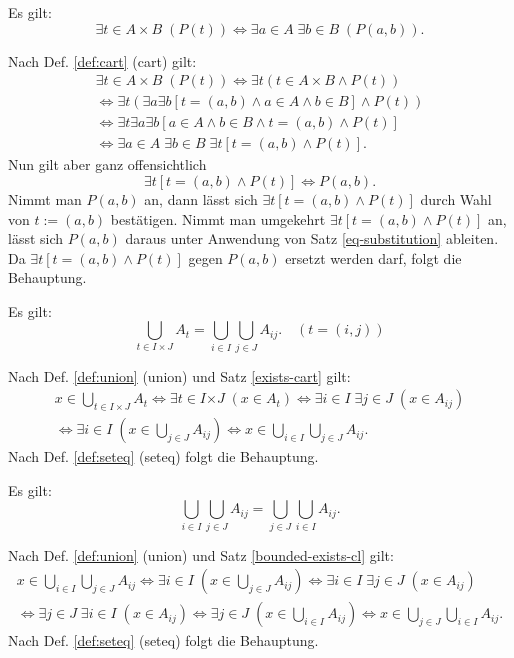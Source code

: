 \begin{Satz}\label{exists-cart}
Es gilt:
\[\exists t{\in}A{\times}B\;(P(t))
\iff \exists a{\in}A\;\exists b{\in}B\;(P(a,b)).\]
\end{Satz}

\begin{Beweis}
Nach Def. \ref{def:cart} (cart) gilt:
\begin{gather*}
\exists t{\in}A{\times}B\;(P(t))
\iff \exists t(t\in A\times B\land P(t))\\
\iff \exists t(\exists a\exists b[t=(a,b)\land a\in A\land b\in B]\land P(t))\\
\iff \exists t\exists a\exists b[a\in A\land b\in B\land t=(a,b)\land P(t)]\\
\iff \exists a{\in}A\;\exists b{\in}B\;\exists t[t=(a,b)\land P(t)].
\end{gather*}
Nun gilt aber ganz offensichtlich
\[\exists t[t=(a,b)\land P(t)]\iff P(a,b).\]
Nimmt man $P(a,b)$ an, dann lässt sich $\exists t[t=(a,b)\land P(t)]$
durch Wahl von $t:=(a,b)$ bestätigen. Nimmt man umgekehrt
$\exists t[t=(a,b)\land P(t)]$ an, lässt sich $P(a,b)$ daraus
unter Anwendung von Satz \ref{eq-substitution} ableiten.
Da $\exists t[t=(a,b)\land P(t)]$ gegen $P(a,b)$ ersetzt werden
darf, folgt die Behauptung.\,\qedsymbol
\end{Beweis}

\begin{Satz}\label{cup-cart}
Es gilt:
\[\bigcup_{t\in I\times J} A_t
= \bigcup_{i\in I}\bigcup_{j\in J} A_{ij}.\quad (t=(i,j))\]
\end{Satz}

\begin{Beweis}
Nach Def. \ref{def:union} (union) und Satz \ref{exists-cart} gilt:
\begin{gather*}
x\in \bigcup_{t\in I\times J} A_t
\iff \exists t{\in}I{\times J}\;(x\in A_t)
\iff \exists i{\in}I\;\exists j{\in}J\;(x\in A_{ij})\\
\iff \exists i{\in}I\; (x\in \bigcup_{j\in J} A_{ij})
\iff x\in\bigcup_{i\in I}\bigcup_{j\in J} A_{ij}.
\end{gather*}
Nach Def. \ref{def:seteq} (seteq) folgt die Behauptung.\,\qedsymbol
\end{Beweis}

\begin{Satz}
Es gilt:
\[\bigcup_{i\in I}\bigcup_{j\in J} A_{ij}
= \bigcup_{j\in J}\bigcup_{i\in I} A_{ij}.\]
\end{Satz}

\begin{Beweis}
Nach Def. \ref{def:union} (union) und Satz \ref{bounded-exists-cl} gilt:
\begin{gather*}
x\in\bigcup_{i\in I}\bigcup_{j\in J} A_{ij}
\iff \exists i{\in}I\;(x\in\bigcup_{j\in J} A_{ij})
\iff \exists i{\in}I\;\exists j{\in}J\;(x\in A_{ij})\\
\iff \exists j{\in}J\;\exists i{\in}I\;(x\in A_{ij})
\iff \exists j{\in}J\;(x\in \bigcup_{i\in I}A_{ij})
\iff x\in\bigcup_{j\in J}\bigcup_{i\in I} A_{ij}.
\end{gather*}
Nach Def. \ref{def:seteq} (seteq) folgt die Behauptung.\,\qedsymbol
\end{Beweis}

